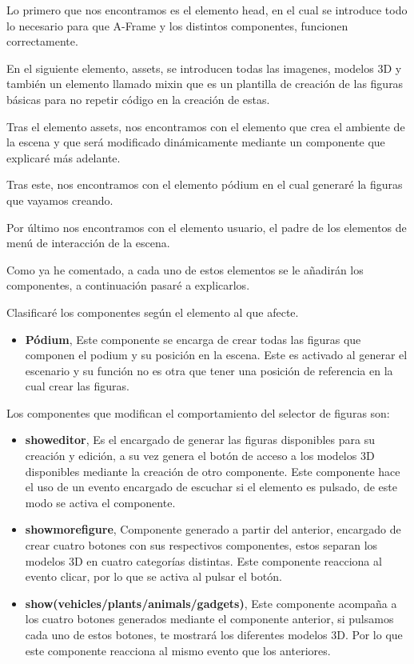 \documentclass[a4paper, 12pt]{book}
\begin{document}
Lo primero que nos encontramos es el elemento head, en el cual  se introduce todo lo necesario para que A-Frame y los distintos componentes, funcionen correctamente.

En el siguiente elemento, assets, se introducen todas las imagenes, modelos 3D y también un elemento llamado mixin que es un plantilla de creación de las figuras básicas para no repetir código en la creación de estas.

Tras el elemento assets, nos encontramos con el elemento que crea el ambiente de la escena y que será modificado dinámicamente mediante un componente que explicaré más adelante.

Tras este, nos encontramos con el elemento pódium en el cual generaré la figuras que vayamos creando.

Por último nos encontramos con el elemento usuario, el  padre de los elementos de menú de interacción de la escena.

Como ya he comentado, a cada uno de estos elementos se le añadirán los componentes, a continuación pasaré a explicarlos.

Clasificaré los componentes según el elemento al que afecte.

\begin{itemize}
    \item \textbf{Pódium}, Este componente se encarga de crear todas las figuras que componen el podium y su posición en la escena. Este es activado al generar el escenario y su función no es otra que tener una posición de referencia en la cual crear las figuras.
\end{itemize}

Los componentes que modifican el comportamiento del selector de figuras son:
\begin{itemize}
    \item \textbf{showeditor}, Es el encargado de generar las figuras disponibles para su creación y edición, a su vez genera el botón de acceso a los modelos 3D disponibles mediante la creación de otro componente. Este componente hace el uso de un evento encargado de escuchar si el elemento es pulsado, de este modo se activa el componente.
    
    \item \textbf{showmorefigure}, Componente generado a partir del anterior, encargado de crear cuatro botones con sus respectivos componentes, estos separan los modelos 3D en cuatro categorías distintas. Este componente reacciona al evento clicar, por lo que se activa al pulsar el botón.

    \item \textbf{show(vehicles/plants/animals/gadgets)}, Este componente acompaña a los cuatro botones generados mediante el componente anterior, si pulsamos cada uno de estos botones, te mostrará los diferentes modelos 3D. Por lo que este componente reacciona al mismo evento que los anteriores.

\end{itemize}
\end{document}

